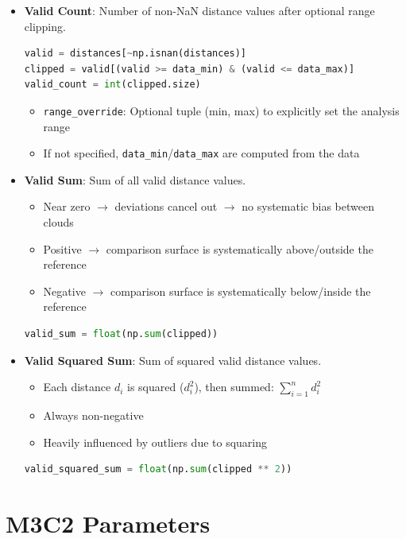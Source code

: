 \documentclass[12pt]{article}
\begin{document}
\begin{itemize}
    \item \textbf{Valid Count}: Number of non-NaN distance values after optional range clipping.
    \begin{lstlisting}[language=Python]
valid = distances[~np.isnan(distances)]
clipped = valid[(valid >= data_min) & (valid <= data_max)]
valid_count = int(clipped.size)
    \end{lstlisting}
    \begin{itemize}
        \item \texttt{range\_override}: Optional tuple (min, max) to explicitly set the analysis range
        \item If not specified, \texttt{data\_min}/\texttt{data\_max} are computed from the data
    \end{itemize}

    \item \textbf{Valid Sum}: Sum of all valid distance values.
    \begin{itemize}
        \item Near zero $\rightarrow$ deviations cancel out $\rightarrow$ no systematic bias between clouds
        \item Positive $\rightarrow$ comparison surface is systematically above/outside the reference
        \item Negative $\rightarrow$ comparison surface is systematically below/inside the reference
    \end{itemize}
    \begin{lstlisting}[language=Python]
valid_sum = float(np.sum(clipped))
    \end{lstlisting}

    \item \textbf{Valid Squared Sum}: Sum of squared valid distance values.
    \begin{itemize}
        \item Each distance $d_i$ is squared ($d_i^2$), then summed: $\sum_{i=1}^{n} d_i^2$
        \item Always non-negative
        \item Heavily influenced by outliers due to squaring
    \end{itemize}
    \begin{lstlisting}[language=Python]
valid_squared_sum = float(np.sum(clipped ** 2))
    \end{lstlisting}
\end{itemize}

\section{M3C2 Parameters}
\end{document}
